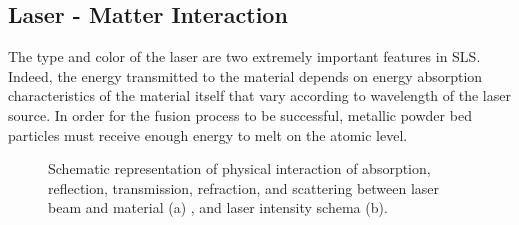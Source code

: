 \subsection{Laser - Matter Interaction}
\label{subsec:sintering}
The type and color of the laser are two extremely important features in SLS. Indeed, the energy transmitted to the material depends on energy absorption characteristics of the material itself that vary according to wavelength of the laser source. In order for the fusion process to be successful, metallic powder bed particles must receive enough energy to melt on the atomic level.
\begin{figure}
    \centering
    \qquad
    
    \caption[Laser interactions and laser intensity.]{Schematic representation of physical interaction of absorption, reflection, transmission, refraction, and scattering between laser beam and material (a) \cite{katayama_fundamentals_2020}, and laser intensity schema (b).}
\end{figure}
